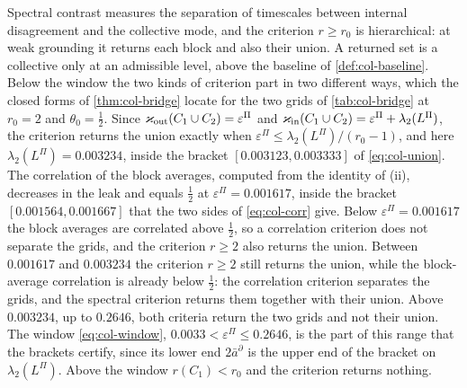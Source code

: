 \begin{remark}\label{rem:col-bridge-reading}
Spectral contrast measures the separation of timescales between internal disagreement and the collective mode, and the criterion $r\ge r_0$ is hierarchical: at weak grounding it returns each block and also their union. A returned set is a collective only at an admissible level, above the baseline of \cref{def:col-baseline}. Below the window the two kinds of criterion part in two different ways, which the closed forms of \cref{thm:col-bridge} locate for the two grids of \cref{tab:col-bridge} at $r_0=2$ and $\theta_0=\frac12$. Since $\varkappa_{\mathrm{out}}(C_1\cup C_2)=\varepsilon^\Pi$ and $\varkappa_{\mathrm{in}}(C_1\cup C_2)=\varepsilon^\Pi+\lambda_2(L^\Pi)$, the criterion returns the union exactly when $\varepsilon^\Pi\le\lambda_2(L^\Pi)/(r_0-1)$, and here $\lambda_2(L^\Pi)=0.003234$, inside the bracket $[0.003123,0.003333]$ of \eqref{eq:col-union}. The correlation of the block averages, computed from the identity of (ii), decreases in the leak and equals $\frac12$ at $\varepsilon^\Pi=0.001617$, inside the bracket $[0.001564,0.001667]$ that the two sides of \eqref{eq:col-corr} give. Below $\varepsilon^\Pi=0.001617$ the block averages are correlated above $\frac12$, so a correlation criterion does not separate the grids, and the criterion $r\ge2$ also returns the union. Between $0.001617$ and $0.003234$ the criterion $r\ge2$ still returns the union, while the block-average correlation is already below $\frac12$: the correlation criterion separates the grids, and the spectral criterion returns them together with their union. Above $0.003234$, up to $0.2646$, both criteria return the two grids and not their union. The window \eqref{eq:col-window}, $0.0033<\varepsilon^\Pi\le0.2646$, is the part of this range that the brackets certify, since its lower end $2\bar a^\partial$ is the upper end of the bracket on $\lambda_2(L^\Pi)$. Above the window $r(C_1)<r_0$ and the criterion returns nothing.


\end{remark}
